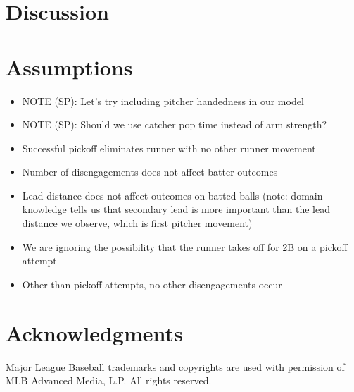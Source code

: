 \documentclass{article}
\begin{document}
  \section{Discussion}

  \section{Assumptions}

    \begin{itemize}
      \item NOTE (SP): Let's try including pitcher handedness in our model
      \item NOTE (SP): Should we use catcher pop time instead of arm strength?
      \item Successful pickoff eliminates runner with no other runner movement
      \item Number of disengagements does not affect batter outcomes
      \item Lead distance does not affect outcomes on batted balls (note: domain knowledge tells us that secondary lead is more important than the lead distance we observe, which is first pitcher movement)
      \item We are ignoring the possibility that the runner takes off for 2B on a pickoff attempt
      \item Other than pickoff attempts, no other disengagements occur
    \end{itemize}

  \section{Acknowledgments}

    Major League Baseball trademarks and copyrights are used with permission of MLB Advanced Media, L.P. All rights reserved.

  \printbibliography
\end{document}
